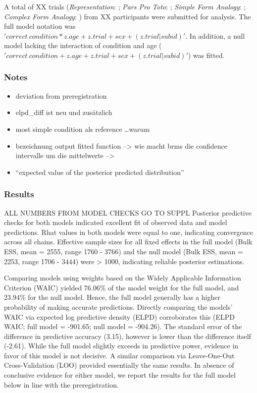 \documentclass[
  man]{apa6}
\providecommand{\tightlist}{%
  \setlength{\itemsep}{0pt}\setlength{\parskip}{0pt}}
\begin{document}
A total of XX trials (\emph{Representation}: ; \emph{Pars Pro Toto}: ; \emph{Simple Form Analogy}: ; \emph{Complex Form Analogy}: ) from XX participants were submitted for analysis. The full model notation was \('correct~condition*z.age+z.trial+sex+(z.trial|subid)'\). In addition, a null model lacking the interaction of condition and age (\('correct~condition+z.age+z.trial+sex+(z.trial|subid)'\)) was fitted.

\subsubsection{Notes}\label{notes}

\begin{itemize}
\tightlist
\item
  deviation from preregistration
\item
  elpd\_diff ist neu und zusätzlich
\item
  most simple condition als reference \ldots warum
\item
  bezeichnung output fitted function --\textgreater{} wie macht brms die confidence intervalle um die mittelwerte --\textgreater{}
\item
  ``expected value of the posterior predicted distribution''
\end{itemize}

\subsubsection{Results}\label{results}

ALL NUMBERS FROM MODEL CHECKS GO TO SUPPL
Posterior predictive checks for both models indicated excellent fit of observed data and model predictions. Rhat values in both models were equal to one, indicating convergence across all chains. Effective sample sizes for all fixed effects in the full model (Bulk ESS, mean = 2555, range 1760 - 3766) and the null model (Bulk ESS, mean = 2253, range 1706 - 3444) were \textgreater{} 1000, indicating reliable posterior estimations.

Comparing models using weights based on the Widely Applicable Information Criterion (WAIC) yielded 76.06\% of the model weight for the full model, and 23.94\% for the null model. Hence, the full model generally has a higher probability of making accurate predictions. Directly comparing the models' WAIC via expected log predictive density (ELPD) corroborates this (ELPD WAIC; full model = -901.65; null model = -904.26). The standard error of the difference in predictive accuracy (3.15), however is lower than the difference itself (-2.61). While the full model slightly exceeds in predictive power, evidence in favor of this model is not decisive. A similar comparison via Leave-One-Out Cross-Validation (LOO) provided essentially the same results. In absence of conclusive evidence for either model, we report the results for the full model below in line with the preregistration.
\end{document}
